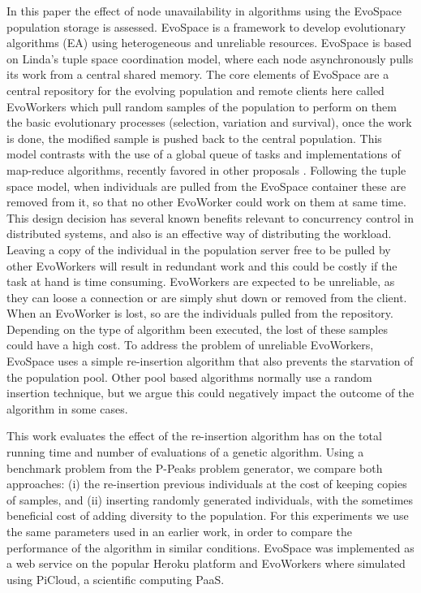\documentclass{llncs}
\begin{document}
In this paper the effect of node unavailability in algorithms using the 
EvoSpace population storage is assessed. EvoSpace \cite{Evospace} is
a framework to develop evolutionary algorithms (EA) using 
heterogeneous and unreliable resources. EvoSpace is based on Linda's tuple
space \cite{linda} coordination model, where each node asynchronously
pulls its work from a central shared memory. The core elements of EvoSpace are a central 
repository for the evolving population and remote clients here called EvoWorkers
which pull random samples of the population to perform on them the basic evolutionary
processes (selection, variation and survival), once the work is done, the
modified sample is pushed back to the central population.
This model contrasts with  the use of a global queue of tasks and
implementations of map-reduce algorithms, recently favored in other proposals 
\cite{fazenda2012,di2013towards,FlexGP}.
Following the tuple space model, when individuals are pulled from the EvoSpace
container these are removed from it, so that no other EvoWorker could work on them at same time.
This design decision has several known benefits relevant to concurrency control 
in distributed systems, and also is an effective way of distributing the
workload. Leaving a copy of the individual in the population server free to
be pulled by other EvoWorkers will result in redundant work and this could be
costly if the task at hand is time consuming. EvoWorkers are expected to be 
unreliable, as they can loose a connection or are simply shut down or removed 
from the client. When an EvoWorker is lost, so are the individuals pulled from
the repository. Depending on the type of algorithm been executed, the lost of
these samples could have a high cost. To address the problem of unreliable 
EvoWorkers, EvoSpace uses a simple re-insertion algorithm that also 
prevents the starvation of the population pool. Other pool based algorithms
normally use a random insertion technique, but we argue this could negatively 
impact the outcome of the algorithm in some cases.  %

This work evaluates the effect 
of the re-insertion algorithm has on the total running time and number of evaluations 
of a genetic algorithm. Using  a benchmark problem from the P-Peaks 
problem generator, we compare both approaches: (i) the re-insertion previous
individuals at the cost of keeping copies of samples, and (ii) inserting  
randomly generated individuals, with the sometimes beneficial cost of 
adding diversity to the population. For this experiments we use the same
parameters used in an earlier work, in order to compare the 
performance of the algorithm in similar conditions.
EvoSpace was implemented as a web service on the popular Heroku platform 
and EvoWorkers where simulated using PiCloud, a scientific computing PaaS. 
\end{document}
